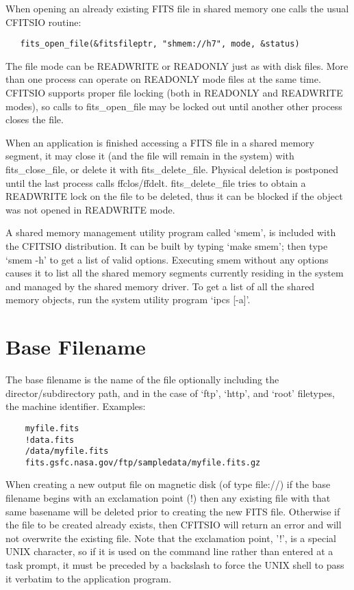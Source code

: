 \documentclass[11pt]{book}
\begin{document}
When opening an already existing FITS file in shared memory one calls
the usual CFITSIO routine:

\begin{verbatim}
   fits_open_file(&fitsfileptr, "shmem://h7", mode, &status)
\end{verbatim}
The file mode can be READWRITE or READONLY just as with disk files.
More than one process can operate on READONLY mode files at the same
time.  CFITSIO supports proper file locking (both in READONLY and
READWRITE modes), so calls to fits\_open\_file may be locked out until
another other process closes the file.

When an application is finished accessing a FITS file in a shared
memory segment, it may close it  (and the file will remain in the
system) with fits\_close\_file, or delete it with fits\_delete\_file.
Physical deletion is postponed until the last process calls
ffclos/ffdelt.  fits\_delete\_file tries to obtain a READWRITE lock on
the file to be deleted, thus it can be blocked if the object was not
opened in READWRITE mode.

A shared memory management utility program called `smem', is included
with the CFITSIO distribution.  It can be built by typing `make smem';
then type `smem -h' to get a list of valid options.  Executing smem
without any options causes it to list all the shared memory segments
currently residing in the system and managed by the shared memory
driver. To get a list of all the shared memory objects, run the system
utility program `ipcs  [-a]'.


\section{Base Filename}

The base filename is the name of the file optionally including the
director/subdirectory path, and in the case of `ftp', `http', and `root'
filetypes, the machine identifier.  Examples:

\begin{verbatim}
    myfile.fits
    !data.fits
    /data/myfile.fits
    fits.gsfc.nasa.gov/ftp/sampledata/myfile.fits.gz
\end{verbatim}

When creating a new output file on magnetic disk (of type file://) if
the base filename begins with an exclamation point (!) then any
existing file with that same basename will be deleted prior to creating
the new FITS file.  Otherwise if the file to be created already exists,
then CFITSIO will return an error and will not overwrite the existing
file.  Note  that the exclamation point,  '!', is a special UNIX
character, so if it is used  on the command line rather than entered at
a task prompt, it must be  preceded by a backslash to force the UNIX
shell to pass it verbatim to the application program.
\end{document}
